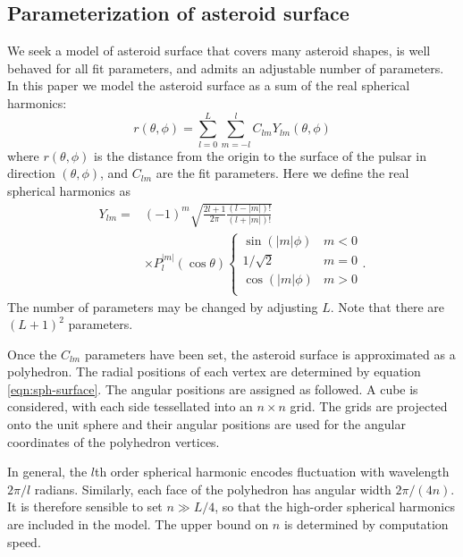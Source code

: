 \documentclass[aps,twocolumn,secnumarabic,balancelastpage,amsmath,amssymb,nofootinbib,floatfix]{revtex4-1}
\begin{document}
\subsection{Parameterization of asteroid surface}
We seek a model of asteroid surface that covers many asteroid shapes, is well behaved for all fit parameters, and admits an adjustable number of parameters. In this paper we model the asteroid surface as a sum of the real spherical harmonics:
\begin{equation}
    r(\theta, \phi) = \sum_{l=0}^L\sum_{m=-l}^l C_{lm} Y_{lm}(\theta, \phi)
    \label{eqn:sph-surface}
\end{equation}
where $r(\theta, \phi)$ is the distance from the origin to the surface of the pulsar in direction $(\theta, \phi)$, and $C_{lm}$ are the fit parameters. Here we define the real spherical harmonics as
\begin{equation}
    \begin{aligned}
        Y_{lm} = &(-1)^m\sqrt{\frac{2l + 1}{2\pi}\frac{(l-|m|)!}{(l+|m|)!}}\\
        &\times P_l^{|m|}(\cos\theta)\begin{cases}
            \sin(|m|\phi)& m < 0\\
            1/\sqrt{2}& m = 0\\
            \cos(|m|\phi)& m > 0\\
        \end{cases}.
        \label{eqn:spherical-harmonics}
    \end{aligned}
\end{equation}
The number of parameters may be changed by adjusting $L$. Note that there are $(L+1)^2$ parameters.


Once the $C_{lm}$ parameters have been set, the asteroid surface is approximated as a polyhedron. The radial positions of each vertex are determined by equation \ref{eqn:sph-surface}. The angular positions are assigned as followed. A cube is considered, with each side tessellated into an $n\times n$ grid. The grids are projected onto the unit sphere and their angular positions are used for the angular coordinates of the polyhedron vertices.

In general, the $l$th order spherical harmonic encodes fluctuation with wavelength $2\pi / l$ radians. Similarly, each face of the polyhedron has angular width $2\pi / (4n)$. It is therefore sensible to set $n \gg L/4$, so that the high-order spherical harmonics are included in the model. The upper bound on $n$ is determined by computation speed.
\end{document}
